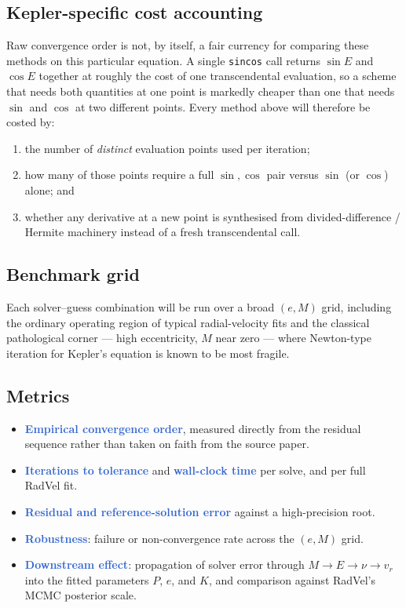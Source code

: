 \documentclass[11pt,a4paper]{article}
\newcommand{\key}[1]{\textcolor{Highlight}{\bfseries #1}}
\begin{document}
\subsection{Kepler-specific cost accounting}
Raw convergence order is not, by itself, a fair currency for comparing
these methods on this particular equation. A single \texttt{sincos} call
returns $\sin E$ and $\cos E$ together at roughly the cost of one
transcendental evaluation, so a scheme that needs both quantities at one
point is markedly cheaper than one that needs $\sin$ and $\cos$ at two
different points. Every method above will therefore be costed by:
\begin{enumerate}
  \item the number of \emph{distinct} evaluation points used per
        iteration;
  \item how many of those points require a full $\sin,\cos$ pair versus
        $\sin$ (or $\cos$) alone; and
  \item whether any derivative at a new point is synthesised from
        divided-difference / Hermite machinery instead of a fresh
        transcendental call.
\end{enumerate}

\subsection{Benchmark grid}
Each solver--guess combination will be run over a broad $(e,M)$ grid,
including the ordinary operating region of typical radial-velocity fits
and the classical pathological corner --- high eccentricity, $M$ near
zero --- where Newton-type iteration for Kepler's equation is known to be
most fragile.

\subsection{Metrics}
\begin{itemize}
  \item \key{Empirical convergence order}, measured directly from the
        residual sequence rather than taken on faith from the source
        paper.
  \item \key{Iterations to tolerance} and \key{wall-clock time} per
        solve, and per full RadVel fit.
  \item \key{Residual and reference-solution error} against a
        high-precision root.
  \item \key{Robustness}: failure or non-convergence rate across the
        $(e,M)$ grid.
  \item \key{Downstream effect}: propagation of solver error through
        $M \rightarrow E \rightarrow \nu \rightarrow v_r$ into the fitted
        parameters $P$, $e$, and $K$, and comparison against RadVel's MCMC
        posterior scale.
\end{itemize}
\end{document}
